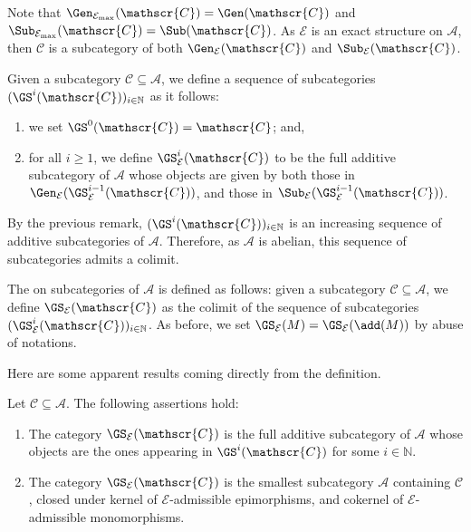 Note that $\Gen_{\mathcal{E}_{\max}}(\mathscr{C}) = \Gen(\mathscr{C})$ and $\Sub_{\mathcal{E}_{\max}}(\mathscr{C}) = \Sub(\mathscr{C})$. As $\mathcal{E}$ is an exact structure on $\mathscr{A}$, then $\mathscr{C}$ is a subcategory of both $\Gen_\mathcal{E}(\mathscr{C})$ and $\Sub_\mathcal{E}(\mathscr{C})$. %

Given a subcategory $\mathscr{C} \subseteq \mathscr{A}$, we define a sequence of subcategories $(\GS^i(\mathscr{C}))_{i\in \mathbb{N}}$ as it follows:
\begin{enumerate}[label=$\bullet$, itemsep=1mm]
    \item we set $\GS^0(\mathscr{C}) = \mathscr{C}$; and,
    \item for all $i \geqslant 1$, we define $\GS^{i}_{\mathcal{E}}(\mathscr{C})$ to be the full additive subcategory of $\mathscr{A}$ whose objects are given by both those in $\Gen_{\mathcal{E}}(\GS^{i-1}_{\mathcal{E}}(\mathscr{C}))$, and those in $\Sub_{\mathcal{E}}(\GS^{i-1}_{\mathcal{E}}(\mathscr{C}))$.
\end{enumerate}
By the previous remark, $(\GS^i(\mathscr{C}))_{i\in \mathbb{N}}$ is an increasing sequence of additive subcategories of $\mathscr{A}$. Therefore, as $\mathscr{A}$ is abelian, this sequence of subcategories admits a colimit.

\begin{definition} \label{def:GSop}
    The  on subcategories of $\mathscr{A}$ is defined as follows: given a subcategory $\mathscr{C} \subseteq \mathscr{A}$, we define $\GS_{\mathcal{E}}(\mathscr{C})$ as the colimit of the sequence of subcategories $(\GS_\mathcal{E}^i(\mathscr{C}))_{i\in \mathbb{N}}$. As before, we set $\GS_\mathcal{E}(M) = \GS_\mathcal{E}(\add(M))$ by abuse of notations.
\end{definition}

Here are some apparent results coming directly from the definition.

\begin{lemma} \label{lem:proponGS}
Let $\mathscr{C} \subseteq \mathscr{A}$. The following assertions hold:
\begin{enumerate}[label=$(\alph*)$,itemsep=1mm]
    \item The category $\GS_\mathcal{E}(\mathscr{C})$ is the full additive subcategory of $\mathscr{A}$ whose objects are the ones appearing in $\GS^i(\mathscr{C})$ for some $i \in \mathbb{N}$.
    \item  The category $\GS_\mathcal{E}(\mathscr{C})$ is the smallest subcategory $\mathscr{A}$ containing $\mathscr{C}$, closed under kernel of $\mathcal{E}$-admissible epimorphisms, and cokernel of $\mathcal{E}$-admissible monomorphisms.  %
\end{enumerate}
\end{lemma}

